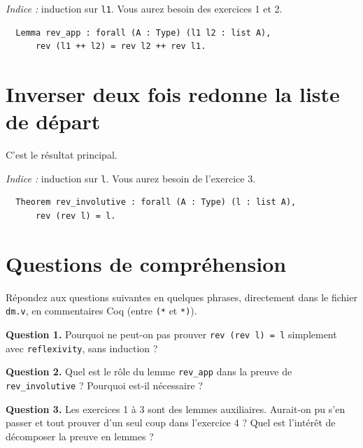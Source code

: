 \documentclass[11pt,a4paper]{article}
\newenvironment{exo}{
\begin{mdframed}[style=exostyle]}{
\end{mdframed}}
\newenvironment{bonus}{
\begin{mdframed}[style=bonusstyle]}{
\end{mdframed}}
\newcommand{\cq}[1]{\texttt{#1}}
\begin{document}

\textit{Indice :} induction sur \cq{l1}. Vous aurez besoin des exercices 1 et 2.

\begin{exo}
\begin{verbatim}
  Lemma rev_app : forall (A : Type) (l1 l2 : list A),
      rev (l1 ++ l2) = rev l2 ++ rev l1.
\end{verbatim}
\end{exo}

\section{Inverser deux fois redonne la liste de départ}



C'est le résultat principal.

\textit{Indice :} induction sur \cq{l}. Vous aurez besoin de l'exercice 3.

\begin{exo}
\begin{verbatim}
  Theorem rev_involutive : forall (A : Type) (l : list A),
      rev (rev l) = l.
\end{verbatim}
\end{exo}

\section*{Questions de compréhension}

Répondez aux questions suivantes en quelques phrases, directement dans le
fichier \texttt{dm.v}, en commentaires Coq (entre \cq{(*} et \cq{*)}).

\begin{bonus}
  \textbf{Question 1.}
  Pourquoi ne peut-on pas prouver \cq{rev (rev l) = l} simplement avec
  \cq{reflexivity}, sans induction ?

  \medskip

  \textbf{Question 2.}
  Quel est le rôle du lemme \cq{rev_app} dans la preuve de \cq{rev_involutive} ?
  Pourquoi est-il nécessaire ?

  \medskip

  \textbf{Question 3.}
  Les exercices 1 à 3 sont des lemmes auxiliaires. Aurait-on pu s'en passer et
  tout prouver d'un seul coup dans l'exercice 4 ? Quel est l'intérêt de
  décomposer la preuve en lemmes ?
\end{bonus}
\end{document}

